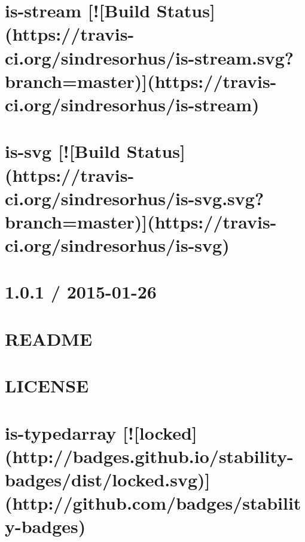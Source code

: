 \documentclass[twoside]{book}
\newcommand{\+}{\discretionary{\mbox{\scriptsize$\hookleftarrow$}}{}{}}
\begin{document}
\chapter{is-\/stream \mbox{[}!\mbox{[}Build Status\mbox{]}(https\+://travis-\/ci.org/sindresorhus/is-\/stream.svg?branch=master)\mbox{]}(https\+://travis-\/ci.org/sindresorhus/is-\/stream)}
\label{md__c_1_workspace_demo_src_main_script_node_modules_is-stream_readme}

\chapter{is-\/svg \mbox{[}!\mbox{[}Build Status\mbox{]}(https\+://travis-\/ci.org/sindresorhus/is-\/svg.svg?branch=master)\mbox{]}(https\+://travis-\/ci.org/sindresorhus/is-\/svg)}
\label{md__c_1_workspace_demo_src_main_script_node_modules_is-svg_readme}

\chapter{1.0.1 / 2015-\/01-\/26}
\label{md__c_1_workspace_demo_src_main_script_node_modules_is-symbol__c_h_a_n_g_e_l_o_g}

\chapter{R\+E\+A\+D\+ME}
\label{md__c_1_workspace_demo_src_main_script_node_modules_is-symbol__r_e_a_d_m_e}

\chapter{L\+I\+C\+E\+N\+SE}
\label{md__c_1_workspace_demo_src_main_script_node_modules_is-typedarray__l_i_c_e_n_s_e}

\chapter{is-\/typedarray \mbox{[}!\mbox{[}locked\mbox{]}(http\+://badges.github.\+io/stability-\/badges/dist/locked.svg)\mbox{]}(http\+://github.com/badges/stability-\/badges)}
\label{md__c_1_workspace_demo_src_main_script_node_modules_is-typedarray__r_e_a_d_m_e}

\end{document}
